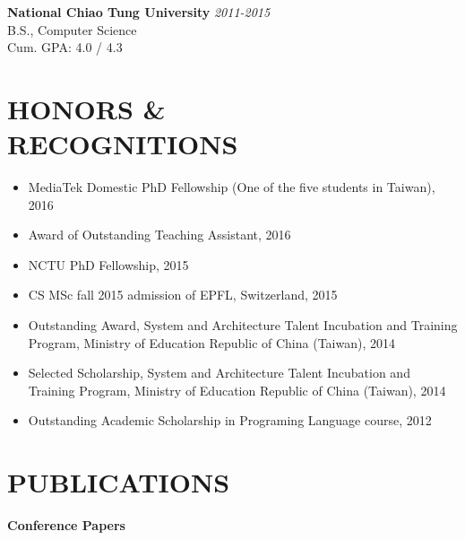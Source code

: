 \documentclass[margin, 9pt]{res} %
\begin{document}
\begin{resume}
\vspace*{-5pt}
\textbf{National Chiao Tung University} \hfill\textit{2011-2015}\\
B.S., Computer Science\\
Cum. GPA: 4.0 / 4.3\\


\section{HONORS \&\\ RECOGNITIONS}

\vspace*{-1pt}
\begin{itemize}[leftmargin=*] \itemsep -4pt
  \item MediaTek Domestic PhD Fellowship (One of the five students in Taiwan), 2016
  \item Award of Outstanding Teaching Assistant, 2016
	\item NCTU PhD Fellowship, 2015
	\item CS MSc fall 2015 admission of EPFL, Switzerland, 2015
	\item Outstanding Award, System and Architecture Talent Incubation and
  Training Program, Ministry of Education Republic of China (Taiwan), 2014
	\item Selected Scholarship, System and Architecture Talent Incubation and
  Training Program, Ministry of Education Republic of China (Taiwan), 2014
	\item Outstanding Academic Scholarship in Programing Language course, 2012
\end{itemize}


\section{PUBLICATIONS}

{\large\textbf{Conference Papers}}


\end{resume}
\end{document}
